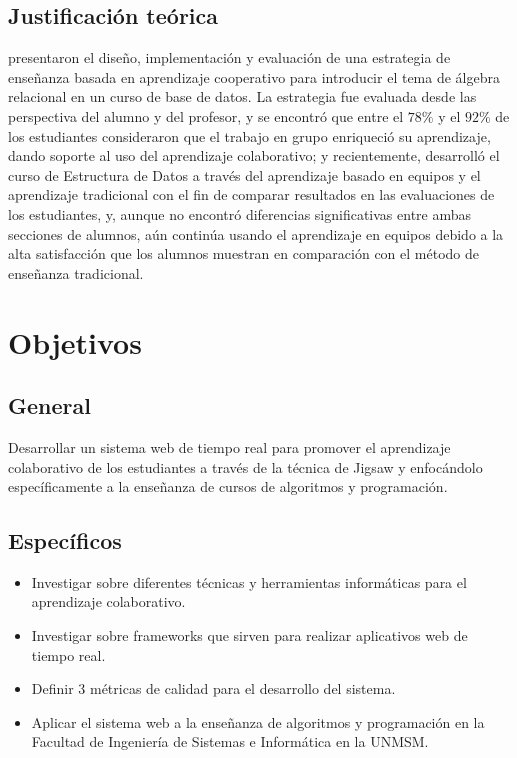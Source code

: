 \subsection{Justificación teórica}
 presentaron el diseño, implementación y evaluación de una estrategia de enseñanza basada en aprendizaje cooperativo para introducir el tema de álgebra relacional en un curso de base de datos. La estrategia fue evaluada desde las perspectiva del alumno y del profesor, y se encontró que entre el $78\%$ y el $92\%$ de los estudiantes consideraron que el trabajo en grupo enriqueció su aprendizaje, dando soporte al uso del aprendizaje colaborativo; y recientemente,  desarrolló el curso de Estructura de Datos a través del aprendizaje basado en equipos y el aprendizaje tradicional con el fin de comparar resultados en las evaluaciones de los estudiantes, y, aunque no encontró diferencias significativas entre ambas secciones de alumnos, aún continúa usando el aprendizaje en equipos debido a la alta satisfacción que los alumnos muestran en comparación con el método de enseñanza tradicional.\\


\section{Objetivos}
\subsection{General}
Desarrollar un sistema web de tiempo real para promover el aprendizaje colaborativo de los estudiantes a través de la técnica de Jigsaw y enfocándolo específicamente a la enseñanza de cursos de algoritmos y programación.
\subsection{Específicos}
\begin{itemize}
  \item Investigar sobre diferentes técnicas y herramientas informáticas para el aprendizaje colaborativo.
  \item Investigar sobre frameworks que sirven para realizar aplicativos web de tiempo real.
  \item Definir 3 métricas de calidad para el desarrollo del sistema.
  \item Aplicar el sistema web a la enseñanza de algoritmos y programación en la Facultad de Ingeniería de Sistemas e Informática en la UNMSM.
\end{itemize}

